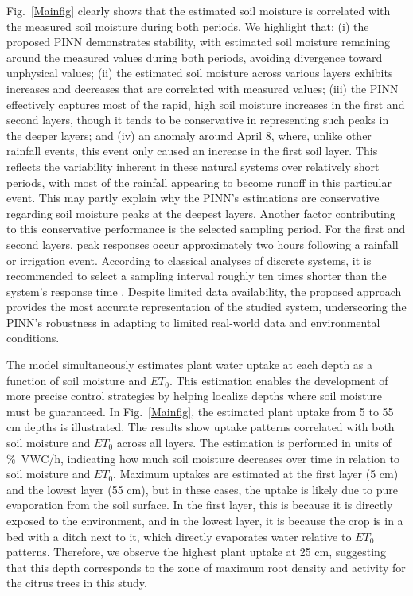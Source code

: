 \documentclass[pdflatex,sn-nature]{sn-jnl}%
\theoremstyle{thmstyleone}%
\theoremstyle{thmstyletwo}%
\theoremstyle{thmstylethree}%
\begin{document}
Fig.~\ref{Mainfig} clearly shows that the estimated soil moisture is correlated with the measured soil moisture during both periods. We highlight that: (i) the proposed PINN demonstrates stability, with estimated soil moisture remaining around the measured values during both periods, avoiding divergence toward unphysical values; (ii) the estimated soil moisture across various layers exhibits increases and decreases that are correlated with measured values; (iii) the PINN effectively captures most of the rapid, high soil moisture increases in the first and second layers, though it tends to be conservative in representing such peaks in the deeper layers; and (iv) an anomaly around April 8, where, unlike other rainfall events, this event only caused an increase in the first soil layer. This reflects the variability inherent in these natural systems over relatively short periods, with most of the rainfall appearing to become runoff in this particular event. This may partly explain why the PINN’s estimations are conservative regarding soil moisture peaks at the deepest layers. Another factor contributing to this conservative performance is the selected sampling period. For the first and second layers, peak responses occur approximately two hours following a rainfall or irrigation event. According to classical analyses of discrete systems, it is recommended to select a sampling interval roughly ten times shorter than the system's response time \cite{Franklin1998}. Despite limited data availability, the proposed approach provides the most accurate representation of the studied system, underscoring the PINN's robustness in adapting to limited real-world data and environmental conditions.

The model simultaneously estimates plant water uptake at each depth as a function of soil moisture and $ET_0$. This estimation enables the development of more precise control strategies by helping localize depths where soil moisture must be guaranteed. In Fig.~\ref{Mainfig}, the estimated plant uptake from 5 to  55 \si{cm} depths is illustrated. The results show uptake patterns correlated with both soil moisture and $ET_0$ across all layers. The estimation is performed in units of \si{\%VWC/h}, indicating how much soil moisture decreases over time in relation to soil moisture and $ET_0$. Maximum uptakes are estimated at the first layer (5 \si{cm}) and the lowest layer (55 \si{cm}), but in these cases, the uptake is likely due to pure evaporation from the soil surface. In the first layer, this is because it is directly exposed to the environment, and in the lowest layer, it is because the crop is in a bed with a ditch next to it, which directly evaporates water relative to $ET_0$ patterns. Therefore, we observe the highest plant uptake at 25 \si{cm}, suggesting that this depth corresponds to the zone of maximum root density and activity for the citrus trees in this study.
\end{document}
